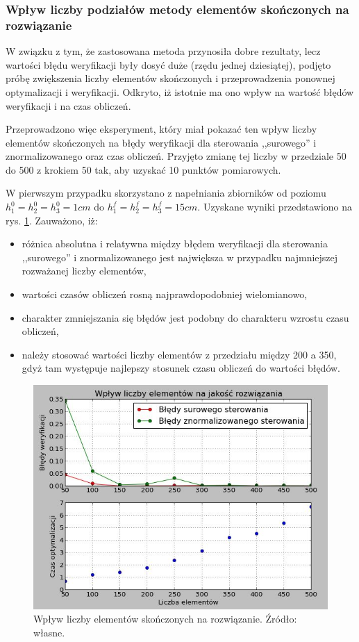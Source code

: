 \subsubsection{Wpływ liczby podziałów metody elementów skończonych na rozwiązanie}

W związku z tym, że zastosowana metoda przynosiła dobre rezultaty, lecz wartości błędu weryfikacji były dosyć duże (rzędu jednej dziesiątej), podjęto próbę zwiększenia liczby elementów skończonych i przeprowadzenia ponownej optymalizacji i weryfikacji. Odkryto, iż istotnie ma ono wpływ na wartość błędów weryfikacji i na czas obliczeń.

Przeprowadzono więc eksperyment, który miał pokazać ten wpływ liczby elementów skończonych na błędy weryfikacji dla sterowania ,,surowego'' i znormalizowanego oraz czas obliczeń. Przyjęto zmianę tej liczby w przedziale 50 do 500 z krokiem 50 tak, aby uzyskać 10 punktów pomiarowych.

W pierwszym przypadku skorzystano z napełniania zbiorników od poziomu $h_{1}^{0} = h_{2}^{0} = h_{3}^{0} = 1 cm$ do $h_{1}^{f} = h_{2}^{f} = h_{3}^{f} = 15 cm$. Uzyskane wyniki przedstawiono na rys. \ref{fig:elementsinfluence1-15_50-500}. Zauważono, iż:
\begin{itemize}
    \item różnica absolutna i relatywna między błędem weryfikacji dla sterowania ,,surowego'' i znormalizowanego jest największa w przypadku najmniejszej rozważanej liczby elementów,
    \item wartości czasów obliczeń rosną najprawdopodobniej wielomianowo,
    \item charakter zmniejszania się błędów jest podobny do charakteru wzrostu czasu obliczeń,
    \item należy stosować wartości liczby elementów z przedziału między 200 a 350, gdyż tam występuje najlepszy stosunek czasu obliczeń do wartości błędów.
\end{itemize}

\begin{figure}[ht]
    \centering
    \includegraphics{Grafika/elements_influence_1-15_50-500}
    \caption{Wpływ liczby elementów skończonych na rozwiązanie. Źródło: własne.}
    \label{fig:elementsinfluence1-15_50-500}
\end{figure}

